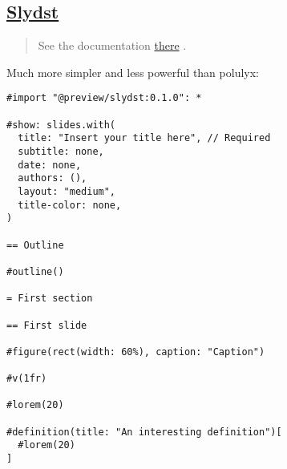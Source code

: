 \subsection{\texorpdfstring{\hyperref[slydst]{Slydst}}{Slydst}}\label{slydst}

\begin{quote}
See the documentation
\href{https://github.com/glambrechts/slydst?ysclid=lr2gszrkck541184604}{there}
.
\end{quote}

Much more simpler and less powerful than polulyx:

\begin{verbatim}
#import "@preview/slydst:0.1.0": *

#show: slides.with(
  title: "Insert your title here", // Required
  subtitle: none,
  date: none,
  authors: (),
  layout: "medium",
  title-color: none,
)

== Outline

#outline()

= First section

== First slide

#figure(rect(width: 60%), caption: "Caption")

#v(1fr)

#lorem(20)

#definition(title: "An interesting definition")[
  #lorem(20)
]
\end{verbatim}

\pandocbounded{}

\pandocbounded{}

\pandocbounded{}

\pandocbounded{}
